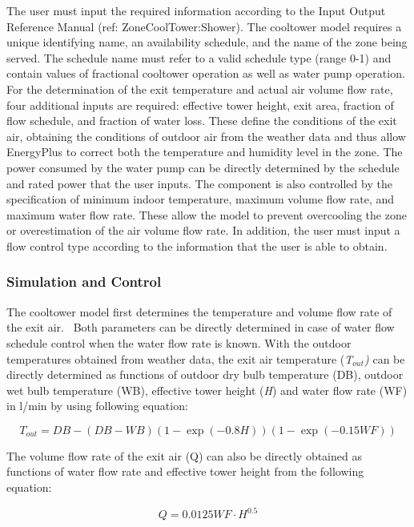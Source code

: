 The user must input the required information according to the Input Output Reference Manual (ref: ZoneCoolTower:Shower). The cooltower model requires a unique identifying name, an availability schedule, and the name of the zone being served. The schedule name must refer to a valid schedule type (range 0-1) and contain values of fractional cooltower operation as well as water pump operation. For the determination of the exit temperature and actual air volume flow rate, four additional inputs are required: effective tower height, exit area, fraction of flow schedule, and fraction of water loss. These define the conditions of the exit air, obtaining the conditions of outdoor air from the weather data and thus allow EnergyPlus to correct both the temperature and humidity level in the zone. The power consumed by the water pump can be directly determined by the schedule and rated power that the user inputs. The component is also controlled by the specification of minimum indoor temperature, maximum volume flow rate, and maximum water flow rate. These allow the model to prevent overcooling the zone or overestimation of the air volume flow rate. In addition, the user must input a flow control type according to the information that the user is able to obtain.

\subsubsection{Simulation and Control}\label{simulation-and-control-5-000}

The cooltower model first determines the temperature and volume flow rate of the exit air.~ Both parameters can be directly determined in case of water flow schedule control when the water flow rate is known. With the outdoor temperatures obtained from weather data, the exit air temperature (\emph{T\(_{out}\))} can be directly determined as functions of outdoor dry bulb temperature (DB), outdoor wet bulb temperature (WB), effective tower height (\emph{H}) and water flow rate (WF) in l/min by using following equation:

\begin{equation}
{T_{out}} = DB - (DB - WB)(1 - \exp ( - 0.8H))(1 - \exp ( - 0.15WF))
\end{equation}

The volume flow rate of the exit air (Q) can also be directly obtained as functions of water flow rate and effective tower height from the following equation:

\begin{equation}
Q = 0.0125WF \cdot {H^{0.5}}
\end{equation}


